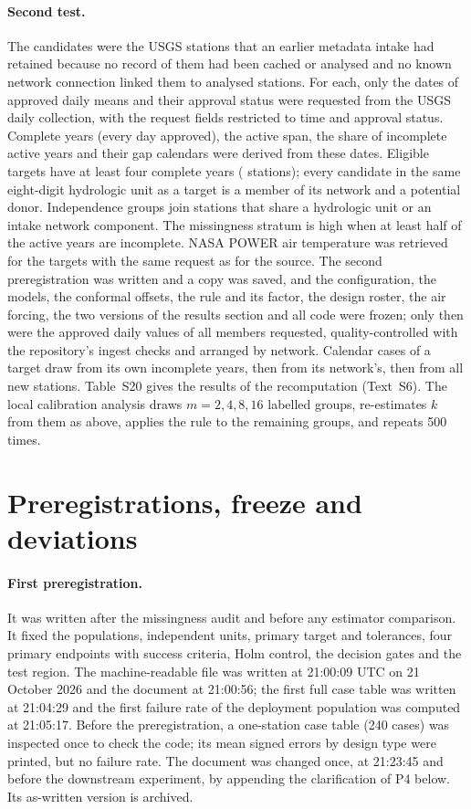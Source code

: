 \documentclass[draft]{agujournal2025}
\begin{document}
\paragraph{Second test.} The candidates were the \TNewCandidates{} USGS stations that an earlier metadata intake had retained because no record of them had been cached or analysed and no known network connection linked them to analysed stations. For each, only the dates of approved daily means and their approval status were requested from the USGS daily collection, with the request fields restricted to time and approval status. Complete years (every day approved), the active span, the share of incomplete active years and their gap calendars were derived from these dates. Eligible targets have at least four complete years (\TNewStationsDesign{} stations); every candidate in the same eight-digit hydrologic unit as a target is a member of its network and a potential donor. Independence groups join stations that share a hydrologic unit or an intake network component. The missingness stratum is high when at least half of the active years are incomplete. NASA POWER air temperature was retrieved for the targets with the same request as for the source. The second preregistration was written and a copy was saved, and the configuration, the models, the conformal offsets, the rule and its factor, the design roster, the air forcing, the two versions of the results section and all code were frozen; only then were the approved daily values of all members requested, quality-controlled with the repository's ingest checks and arranged by network. Calendar cases of a target draw from its own incomplete years, then from its network's, then from all new stations. Table~S20 gives the results of the recomputation (Text~S6). The local calibration analysis draws $m = 2, 4, 8, 16$ labelled groups, re-estimates $k$ from them as above, applies the rule to the remaining groups, and repeats 500 times.

\section{Preregistrations, freeze and deviations}
\paragraph{First preregistration.} It was written after the missingness audit and before any estimator comparison. It fixed the populations, independent units, primary target and tolerances, four primary endpoints with success criteria, Holm control, the decision gates and the test region. The machine-readable file was written at 21:00:09 UTC on 21 October 2026 and the document at 21:00:56; the first full case table was written at 21:04:29 and the first failure rate of the deployment population was computed at 21:05:17. Before the preregistration, a one-station case table (240 cases) was inspected once to check the code; its mean signed errors by design type were printed, but no failure rate. The document was changed once, at 21:23:45 and before the downstream experiment, by appending the clarification of P4 below. Its as-written version is archived.
\end{document}
